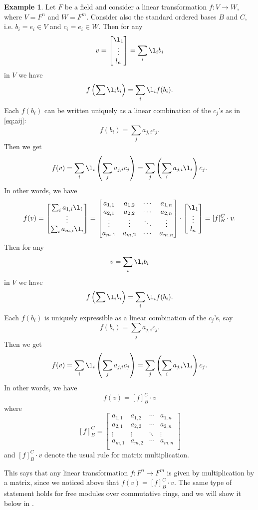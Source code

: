 \documentclass[12pt]{report}
\numberwithin{equation}{section}
\numberwithin{theorem}{chapter}
\theoremstyle{definition}
\newtheorem{example}[theorem]{Example}
\newtheorem*{basic properties}{Basic Properties}
\newtheorem*{Important Remark}{Important Remark}
\begin{document}
\begin{example}\label{linear transf mult by matrices}
Let $F$ be a field and consider a linear transformation $f\!:V\to W$, where $V=F^n$ and $W=F^m$. Consider also the standard ordered bases $B$ and $C$, i.e. $b_i=e_i\in V$ and $c_i=e_i\in W$. Then for any 
$$v =\begin{bmatrix} \l_1\\\vdots\\l_n\end{bmatrix} =\sum_i \l_i b_i$$
in $V$ we have 
$$f \left( \sum \l_i b_i \right) = \sum_i \l_i f(b_i).$$
Each $f(b_i)$ can be written uniquely as a linear combination of the $c_j$'s as in \eqref{eq:aij}:
$$f(b_i) = \sum_j a_{j,i} c_j.$$
Then we get
$$f(v) = \sum_i\l_i\left( \sum_{j} a_{j,i} c_j \right)= \sum_j \left(\sum_i a_{j,i} \l_i\right) c_j.$$
In other words, we have
$$f(v) = \begin{bmatrix}
\sum_i a_{1,i} \l_i \\
\vdots\\
\sum_i a_{m,i} \l_i
\end{bmatrix}
=\begin{bmatrix}
a_{1,1} & a_{1,2} & \cdots & a_{1,n} \\
a_{2,1} & a_{2,2} & \cdots & a_{2,n} \\
\vdots & \vdots & \ddots & \vdots \\
a_{m,1} & a_{m,2} & \cdots & a_{m,n} \\
\end{bmatrix}
\cdot
\begin{bmatrix} \l_1\\\vdots\\l_n\end{bmatrix}
=[f]_B^C\cdot v.$$
Then for any 
$$v = \sum_i \l_i b_i$$
in $V$ we have 
$$f \left( \sum \l_i b_i \right) = \sum_i \l_i f(b_i).$$
Each $f(b_i)$ is uniquely expressible as a linear combination of the $c_j$'s, say
$$f(b_i) = \sum_j a_{j,i} c_j.$$
Then we get
$$f(v) = \sum_i\l_i\left( \sum_{j} a_{j,i} c_j \right)= \sum_j \left(\sum_i a_{j,i} \l_i\right) c_j.$$
In other words, we have
$$f(v) = [f]_B^C\cdot v$$
where
$$[f]_B^C= 
\begin{bmatrix}
a_{1,1} & a_{1,2} & \cdots & a_{1,n} \\
a_{2,1} & a_{2,2} & \cdots & a_{2,n} \\
\vdots & \vdots & \ddots & \vdots \\
a_{m,1} & a_{m,2} & \cdots & a_{m,n} \\
\end{bmatrix}$$
and $[f]_B^C \cdot v$ denote the usual rule for matrix multiplication.

This says that any linear transformation $f\!:F^n\to F^m$ is given by multiplication by a matrix, since we noticed above that $f(v) = [f]_B^C\cdot v$. The same type of statement holds for free modules over commutative rings, and we will show it below in .
\end{example}
\end{document}
